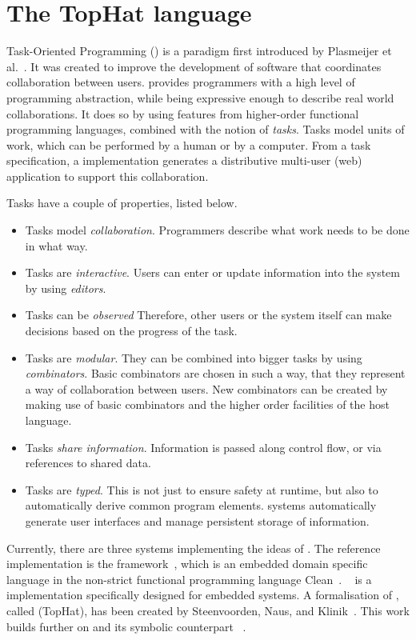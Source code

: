 
\section{The TopHat language}
\label{sec:tophat}

Task-Oriented Programming (\TOP) is a paradigm first introduced by Plasmeijer et al.~\cite{DBLP:conf/ppdp/PlasmeijerLMAK12}.
It was created to improve the development of software that coordinates collaboration between users.
\TOP provides programmers with a high level of programming abstraction,
while being expressive enough to describe real world collaborations.
It does so by using features from higher-order functional programming languages,
combined with the notion of \emph{tasks}.
Tasks model units of work, which can be performed by a human or by a computer.
From a task specification, a \TOP implementation generates a distributive multi-user (web) application to support this collaboration.

Tasks have a couple of properties, listed below.
\begin{itemize}
  \item
    Tasks model \emph{collaboration}.
    Programmers describe what work needs to be done in what way.
  \item
    Tasks are \emph{interactive}.
    Users can enter or update information into the system by using \emph{editors}.
  \item
    Tasks can be \emph{observed}
    Therefore, other users or the system itself can make decisions based on the progress of the task.
  \item
    Tasks are \emph{modular}.
    They can be combined into bigger tasks by using \emph{combinators}.
    Basic combinators are chosen in such a way, that they represent a way of collaboration between users.
    New combinators can be created by making use of basic combinators and the higher order facilities of the host language.
  \item
    Tasks \emph{share information}.
    Information is passed along control flow, or via references to shared data.
  \item
    Tasks are \emph{typed}.
    This is not just to ensure safety at runtime,
    but also to automatically derive common program elements.
    \TOP systems automatically generate user interfaces and manage persistent storage of information.
\end{itemize}

Currently, there are three systems implementing the ideas of \TOP.
The reference implementation is the \ITASKS framework~\cite{},
which is an embedded domain specific language in the non-strict functional programming language Clean~\cite{}.
\MTASKS~\cite{} is a \TOP implementation specifically designed for embedded systems.
A formalisation of \TOP, called \TOPHAT (TopHat), has been created by Steenvoorden, Naus, and Klinik~\cite{}.
This work builds further on \TOPHAT and its symbolic counterpart \STOPHAT~\cite{}.

